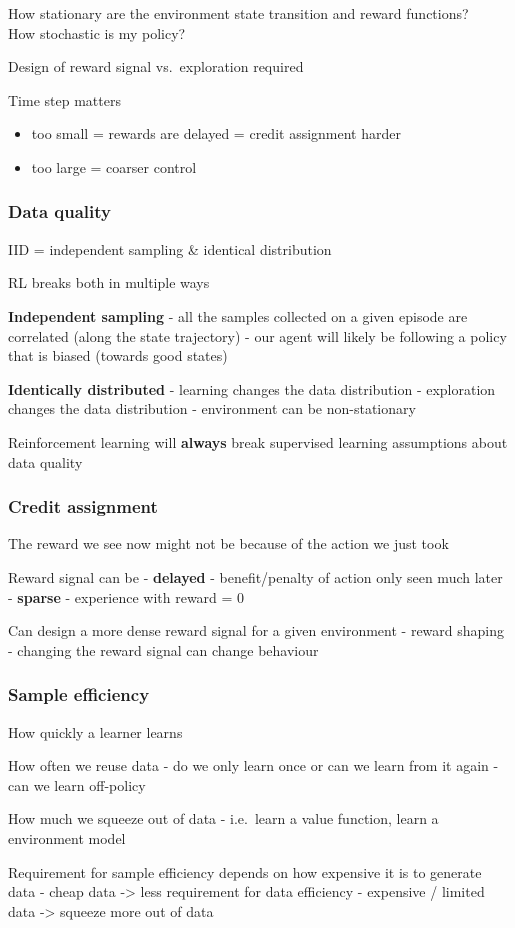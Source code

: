 \documentclass[]{article}
\providecommand{\tightlist}{%
  \setlength{\itemsep}{0pt}\setlength{\parskip}{0pt}}
\begin{document}
How stationary are the environment state transition and reward
functions?\\
How stochastic is my policy?

Design of reward signal vs.~exploration required

Time step matters

\begin{itemize}
\tightlist
\item
  too small = rewards are delayed = credit assignment harder
\item
  too large = coarser control
\end{itemize}

\hypertarget{data-quality}{%
\subsubsection{Data quality}\label{data-quality}}

IID = independent sampling \& identical distribution

RL breaks both in multiple ways

\textbf{Independent sampling} - all the samples collected on a given
episode are correlated (along the state trajectory) - our agent will
likely be following a policy that is biased (towards good states)

\textbf{Identically distributed} - learning changes the data
distribution - exploration changes the data distribution - environment
can be non-stationary

Reinforcement learning will \textbf{always} break supervised learning
assumptions about data quality

\hypertarget{credit-assignment}{%
\subsubsection{Credit assignment}\label{credit-assignment}}

The reward we see now might not be because of the action we just took

Reward signal can be - \textbf{delayed} - benefit/penalty of action only
seen much later\\
- \textbf{sparse} - experience with reward = 0

Can design a more dense reward signal for a given environment - reward
shaping - changing the reward signal can change behaviour

\hypertarget{sample-efficiency}{%
\subsubsection{Sample efficiency}\label{sample-efficiency}}

How quickly a learner learns

How often we reuse data - do we only learn once or can we learn from it
again - can we learn off-policy

How much we squeeze out of data - i.e.~learn a value function, learn a
environment model

Requirement for sample efficiency depends on how expensive it is to
generate data - cheap data -\textgreater{} less requirement for data
efficiency - expensive / limited data -\textgreater{} squeeze more out
of data
\end{document}
